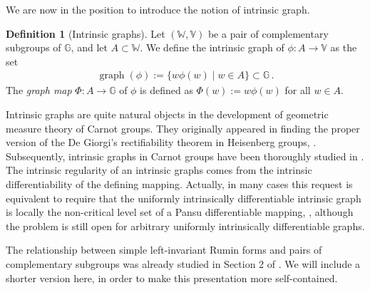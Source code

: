 \documentclass[dvipsnames]{amsart}
\theoremstyle{definition}
\newtheorem{definition}[theorem]{Definition}
\theoremstyle{definition}
\numberwithin{equation}{section}
\newcommand{\W}{\mathbb{W}}
\newcommand{\V}{\mathbb{V}}
\newcommand{\G}{\mathbb{G}}
\begin{document}
We are now in the position to introduce the notion of intrinsic graph.
\begin{definition}[Intrinsic graphs]\label{def: intrinsic graphs} Let $(\W,\V)$ be a pair of complementary subgroups of $\G$, and let $A\subset\W$. We define the intrinsic graph of $\phi\colon A\to\V$ as the set
\begin{align*}
    \operatorname{graph}(\phi):=\{w\phi(w)\mid w\in A\}\subset\G\,.
\end{align*}
The \textit{graph map} $\Phi\colon A\to\G$ of $\phi$ is defined as $\Phi(w):=w\phi(w)$ for all $w\in A$.
\end{definition}
Intrinsic graphs are quite natural objects in the development of geometric measure theory of Carnot groups. They originally appeared in finding the proper version of the De Giorgi's rectifiability theorem in Heisenberg groups, \cite{FSSC01}. Subsequently, intrinsic graphs in Carnot groups have been thoroughly studied in \cite{FMS14,FranchiSerapioni}. The intrinsic regularity of an intrinsic graphs comes from the intrinsic differentiability of the defining mapping. Actually, in many cases this request is equivalent to require that the uniformly intrinsically differentiable intrinsic graph is locally the non-critical level set of a Pansu differentiable mapping, \cite{arena2009intrinsic,DiD21,ADDDLD24,CorniPhD}, although the problem is still open for arbitrary uniformly intrinsically differentiable graphs.


The relationship between simple left-invariant Rumin forms and pairs of complementary subgroups was already studied in Section 2 of \cite{FranchiSerapioni}. We will include a shorter version here, in order to make this presentation more self-contained.
\end{document}
